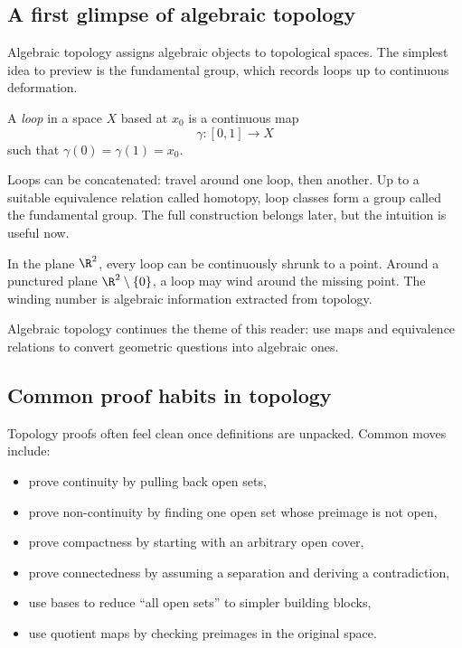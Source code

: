 \subsection{A first glimpse of algebraic topology}

Algebraic topology assigns algebraic objects to topological spaces. The simplest
idea to preview is the fundamental group, which records loops up to continuous
deformation.

\begin{definition}
A \emph{loop} in a space $X$ based at $x_0$ is a continuous map
\[
\gamma:[0,1]\to X
\]
such that $\gamma(0)=\gamma(1)=x_0$.
\end{definition}

Loops can be concatenated: travel around one loop, then another. Up to a
suitable equivalence relation called homotopy, loop classes form a group called
the fundamental group. The full construction belongs later, but the intuition is
useful now.

\begin{example}
In the plane $\R^2$, every loop can be continuously shrunk to a point. Around a
punctured plane $\R^2\setminus\{0\}$, a loop may wind around the missing point.
The winding number is algebraic information extracted from topology.
\end{example}

\begin{focusbox}
Algebraic topology continues the theme of this reader: use maps and equivalence
relations to convert geometric questions into algebraic ones.
\end{focusbox}

\subsection{Common proof habits in topology}

Topology proofs often feel clean once definitions are unpacked. Common moves
include:

\begin{itemize}
\item prove continuity by pulling back open sets,
\item prove non-continuity by finding one open set whose preimage is not open,
\item prove compactness by starting with an arbitrary open cover,
\item prove connectedness by assuming a separation and deriving a contradiction,
\item use bases to reduce ``all open sets'' to simpler building blocks,
\item use quotient maps by checking preimages in the original space.
\end{itemize}

